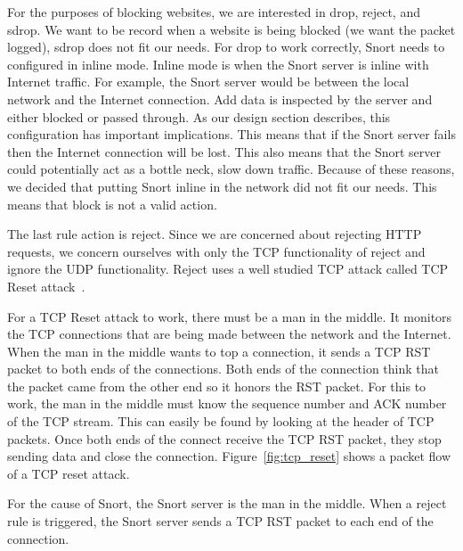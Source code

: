 For the purposes of blocking websites, we are interested in drop, reject, and
sdrop. We want to be record when a website is being blocked (we want the packet
logged), sdrop does not fit our needs. For drop to work correctly, Snort needs
to configured in inline mode. Inline mode is when the Snort server is inline
with Internet traffic. For example, the Snort server would be between the local
network and the Internet connection. Add data is inspected by the server and
either blocked or passed through. As our design section describes, this
configuration has important implications. This means that if the Snort server
fails then the Internet connection will be lost. This also means that the Snort
server could potentially act as a bottle neck, slow down traffic. Because of
these reasons, we decided that putting Snort inline in the network did not fit
our needs. This means that block is not a valid action.

The last rule action is reject. Since we are concerned about rejecting HTTP
requests, we concern ourselves with only the TCP functionality of reject and
ignore the UDP functionality. Reject uses a well studied TCP attack called TCP
Reset attack~\cite{XXX}.

For a TCP Reset attack to work, there must be a man in the middle. It monitors
the TCP connections that are being made between the network and the Internet.
When the man in the middle wants to top a connection, it sends a TCP RST packet
to both ends of the connections. Both ends of the connection think that the
packet came from the other end so it honors the RST packet. For this to work,
the man in the middle must know the sequence number and ACK number of the TCP
stream. This can easily be found by looking at the header of TCP packets. Once
both ends of the connect receive the TCP RST packet, they stop sending data and
close the connection. Figure~\ref{fig:tcp_reset} shows a packet flow of a TCP
reset attack.

For the cause of Snort, the Snort server is the man in the middle. When a
reject rule is triggered, the Snort server sends a TCP RST packet to each end
of the connection.




